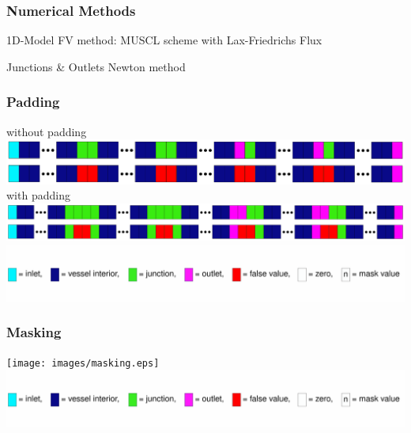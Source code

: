 \documentclass{beamer}
\begin{document}
	\begin{frame}
		\frametitle{Numerical Methods}
		\begin{block}{1D-Model}
			FV method: MUSCL scheme with Lax-Friedrichs Flux
		\end{block}
		\begin{block}{Junctions \& Outlets}
			Newton method
		\end{block}
	\end{frame}
	\begin{frame}
		\frametitle{Padding}
		without padding
		\includegraphics[width=\textwidth]{images/padding1.eps}
		with padding
		\includegraphics[width=\textwidth]{images/padding2.eps}
		\includegraphics[width=\textwidth]{images/legend.eps}
	\end{frame}
	\begin{frame}
		\frametitle{Masking}
		\texttt{[image: images/masking.eps]}
		\includegraphics[width=\textwidth]{images/legend.eps}
	\end{frame}
\end{document}
